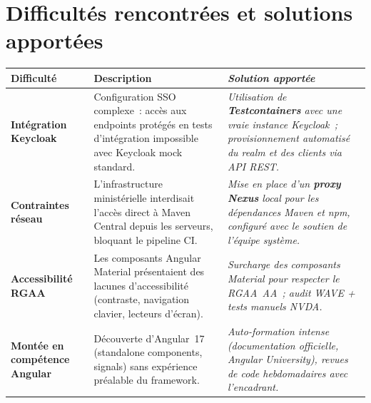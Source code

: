 \documentclass[a4paper,11pt]{article}
\begin{document}
\section{Difficult\'{e}s rencontr\'{e}es et solutions apport\'{e}es}
\label{sec:difficultes}

\begin{center}
\renewcommand{\arraystretch}{1.45}
\begin{tabularx}{\textwidth}{>{\sffamily\bfseries\color{InstitBlue}}p{3.2cm}
                              X
                              >{\itshape}X}
  \toprule
  \rowcolor{InstitBlue!10}
  \textbf{Difficult\'{e}} & \textbf{Description} & \textbf{Solution apport\'{e}e} \\
  \midrule
  Int\'{e}gration Keycloak
    & Configuration SSO complexe~: acc\`{e}s aux endpoints prot\'{e}g\'{e}s en tests
      d'int\'{e}gration impossible avec Keycloak mock standard.
    & Utilisation de \textbf{Testcontainers} avec une vraie instance Keycloak~;
      provisionnement automatis\'{e} du realm et des clients via API REST. \\[4pt]

  Contraintes r\'{e}seau
    & L'infrastructure minist\'{e}rielle interdisait l'acc\`{e}s direct \`{a} Maven Central
      depuis les serveurs, bloquant le pipeline CI.
    & Mise en place d'un \textbf{proxy Nexus} local pour les d\'{e}pendances Maven et npm,
      configur\'{e} avec le soutien de l'\'{e}quipe syst\`{e}me. \\[4pt]

  Accessibilit\'{e} RGAA
    & Les composants Angular Material pr\'{e}sentaient des lacunes d'accessibilit\'{e}
      (contraste, navigation clavier, lecteurs d'\'{e}cran).
    & Surcharge des composants Material pour respecter le RGAA~AA~;
      audit WAVE + tests manuels NVDA. \\[4pt]

  Mont\'{e}e en comp\'{e}tence Angular
    & D\'{e}couverte d'Angular~17 (standalone components, signals) sans
      exp\'{e}rience pr\'{e}alable du framework.
    & Auto-formation intense (documentation officielle, Angular University),
      revues de code hebdomadaires avec l'encadrant. \\
  \bottomrule
\end{tabularx}
\end{center}
\end{document}
